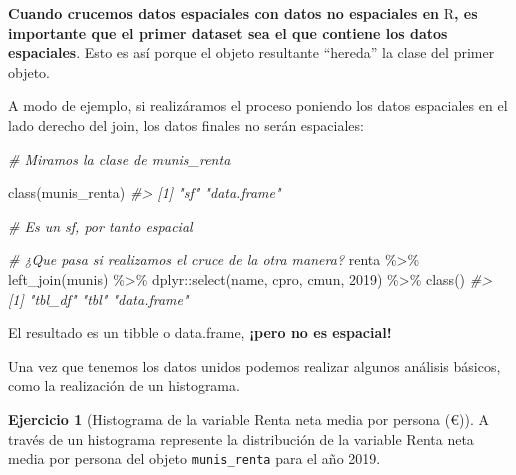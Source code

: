 \documentclass[
]{book}
\newenvironment{Shaded}{\begin{snugshade}}{\end{snugshade}}
\newcommand{\AttributeTok}[1]{\textcolor[rgb]{0.77,0.63,0.00}{#1}}
\newcommand{\CommentTok}[1]{\textcolor[rgb]{0.56,0.35,0.01}{\textit{#1}}}
\newcommand{\FunctionTok}[1]{\textcolor[rgb]{0.00,0.00,0.00}{#1}}
\newcommand{\NormalTok}[1]{#1}
\newcommand{\SpecialCharTok}[1]{\textcolor[rgb]{0.00,0.00,0.00}{#1}}
\newcommand{\StringTok}[1]{\textcolor[rgb]{0.31,0.60,0.02}{#1}}
\theoremstyle{definition}
\theoremstyle{definition}
\theoremstyle{definition}
\newtheorem{exercise}{Ejercicio}[chapter]
\theoremstyle{definition}
\theoremstyle{remark}
\begin{document}
\textbf{Cuando crucemos datos espaciales con datos no espaciales en} R\textbf{, es
importante que el primer dataset sea el que contiene los datos espaciales}.
Esto es así porque el objeto resultante ``hereda'' la clase del primer objeto.

A modo de ejemplo, si realizáramos el proceso poniendo los datos espaciales en
el lado derecho del join, los datos finales no serán espaciales:

\begin{Shaded}
\begin{Highlighting}[]

\CommentTok{\# Miramos la clase de munis\_renta}

\FunctionTok{class}\NormalTok{(munis\_renta)}
\CommentTok{\#\textgreater{} [1] "sf"         "data.frame"}

\CommentTok{\# Es un sf, por tanto espacial}

\CommentTok{\# ¿Que pasa si realizamos el cruce de la otra manera?}
\NormalTok{renta }\SpecialCharTok{\%\textgreater{}\%}
  \FunctionTok{left\_join}\NormalTok{(munis) }\SpecialCharTok{\%\textgreater{}\%}
\NormalTok{  dplyr}\SpecialCharTok{::}\FunctionTok{select}\NormalTok{(name, cpro, cmun, }\StringTok{\textasciigrave{}}\AttributeTok{2019}\StringTok{\textasciigrave{}}\NormalTok{) }\SpecialCharTok{\%\textgreater{}\%}
  \FunctionTok{class}\NormalTok{()}
\CommentTok{\#\textgreater{} [1] "tbl\_df"     "tbl"        "data.frame"}
\end{Highlighting}
\end{Shaded}

El resultado es un tibble o data.frame, \textbf{¡pero no es espacial!}

Una vez que tenemos los datos unidos podemos realizar algunos análisis básicos,
como la realización de un histograma.

\begin{exercise}[Histograma de la variable Renta neta media por persona (€)]
\protect\hypertarget{exr:ex19}{}\label{exr:ex19}A través de un histograma represente la distribución de la variable Renta neta
media por persona del objeto \texttt{munis\_renta} para el año 2019.
\end{exercise}
\end{document}
